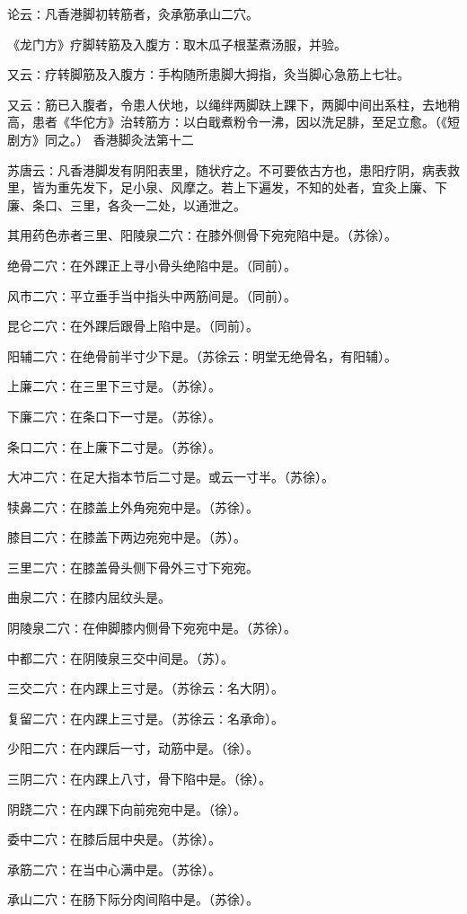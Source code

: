\documentclass[a4paper,12pt,UTF8,twoside]{ctexbook}
\begin{document}
论云∶凡香港脚初转筋者，灸承筋承山二穴。

《龙门方》疗脚转筋及入腹方∶取木瓜子根茎煮汤服，并验。

又云∶疗转脚筋及入腹方∶手构随所患脚大拇指，灸当脚心急筋上七壮。

又云∶筋已入腹者，令患人伏地，以绳绊两脚趺上踝下，两脚中间出系柱，去地稍高，患者《华佗方》治转筋方∶以白戢煮粉令一沸，因以洗足腓，至足立愈。（《短剧方》同之。）
香港脚灸法第十二

苏唐云∶凡香港脚发有阴阳表里，随状疗之。不可要依古方也，患阳疗阴，病表救里，皆为重先发下，足小泉、风摩之。若上下遍发，不知的处者，宜灸上廉、下廉、条口、三里，各灸一二处，以通泄之。

其用药色赤者三里、阳陵泉二穴∶在膝外侧骨下宛宛陷中是。（苏徐）。

绝骨二穴∶在外踝正上寻小骨头绝陷中是。（同前）。

风市二穴∶平立垂手当中指头中两筋间是。（同前）。

昆仑二穴∶在外踝后跟骨上陷中是。（同前）。

阳辅二穴∶在绝骨前半寸少下是。（苏徐云∶明堂无绝骨名，有阳辅）。

上廉二穴∶在三里下三寸是。（苏徐）。

下廉二穴∶在条口下一寸是。（苏徐）。

条口二穴∶在上廉下二寸是。（苏徐）。

大冲二穴∶在足大指本节后二寸是。或云一寸半。（苏徐）。

犊鼻二穴∶在膝盖上外角宛宛中是。（苏徐）。

膝目二穴∶在膝盖下两边宛宛中是。（苏）。

三里二穴∶在膝盖骨头侧下骨外三寸下宛宛。

曲泉二穴∶在膝内屈纹头是。

阴陵泉二穴∶在伸脚膝内侧骨下宛宛中是。（苏徐）。

中都二穴∶在阴陵泉三交中间是。（苏）。

三交二穴∶在内踝上三寸是。（苏徐云∶名大阴）。

复留二穴∶在内踝上三寸是。（苏徐云∶名承命）。

少阳二穴∶在内踝后一寸，动筋中是。（徐）。

三阴二穴∶在内踝上八寸，骨下陷中是。（徐）。

阴跷二穴∶在内踝下向前宛宛中是。（徐）。

委中二穴∶在膝后屈中央是。（苏徐）。

承筋二穴∶在当中心满中是。（苏徐）。

承山二穴∶在肠下际分肉间陷中是。（苏徐）。
\end{document}
